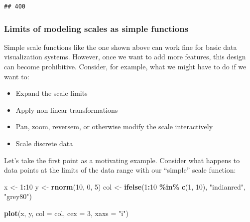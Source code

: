 \documentclass[
]{book}
\newenvironment{Shaded}{\begin{snugshade}}{\end{snugshade}}
\newcommand{\AttributeTok}[1]{\textcolor[rgb]{0.13,0.29,0.53}{#1}}
\newcommand{\DecValTok}[1]{\textcolor[rgb]{0.00,0.00,0.81}{#1}}
\newcommand{\FunctionTok}[1]{\textcolor[rgb]{0.13,0.29,0.53}{\textbf{#1}}}
\newcommand{\NormalTok}[1]{#1}
\newcommand{\OtherTok}[1]{\textcolor[rgb]{0.56,0.35,0.01}{#1}}
\newcommand{\SpecialCharTok}[1]{\textcolor[rgb]{0.81,0.36,0.00}{\textbf{#1}}}
\newcommand{\StringTok}[1]{\textcolor[rgb]{0.31,0.60,0.02}{#1}}
\providecommand{\tightlist}{%
  \setlength{\itemsep}{0pt}\setlength{\parskip}{0pt}}
\theoremstyle{definition}
\theoremstyle{definition}
\theoremstyle{definition}
\theoremstyle{definition}
\theoremstyle{remark}
\begin{document}
\begin{verbatim}
## 400
\end{verbatim}

\subsubsection{Limits of modeling scales as simple functions}\label{limits-of-modeling-scales-as-simple-functions}

Simple scale functions like the one shown above can work fine for basic data visualization systems. However, once we want to add more features, this design can become prohibitive. Consider, for example, what we might have to do if we want to:

\begin{itemize}
\tightlist
\item
  Expand the scale limits
\item
  Apply non-linear transformations
\item
  Pan, zoom, reversem, or otherwise modify the scale interactively
\item
  Scale discrete data
\end{itemize}

Let's take the first point as a motivating example. Consider what happens to data points at the limits of the data range with our ``simple'' scale function:

\begin{Shaded}
\begin{Highlighting}[]
\NormalTok{x }\OtherTok{\textless{}{-}} \DecValTok{1}\SpecialCharTok{:}\DecValTok{10}
\NormalTok{y }\OtherTok{\textless{}{-}} \FunctionTok{rnorm}\NormalTok{(}\DecValTok{10}\NormalTok{, }\DecValTok{0}\NormalTok{, }\DecValTok{5}\NormalTok{)}
\NormalTok{col }\OtherTok{\textless{}{-}} \FunctionTok{ifelse}\NormalTok{(}\DecValTok{1}\SpecialCharTok{:}\DecValTok{10} \SpecialCharTok{\%in\%} \FunctionTok{c}\NormalTok{(}\DecValTok{1}\NormalTok{, }\DecValTok{10}\NormalTok{), }\StringTok{"indianred"}\NormalTok{, }\StringTok{"grey80"}\NormalTok{)}

\FunctionTok{plot}\NormalTok{(x, y, }\AttributeTok{col =}\NormalTok{ col, }\AttributeTok{cex =} \DecValTok{3}\NormalTok{, }\AttributeTok{xaxs =} \StringTok{"i"}\NormalTok{)}
\end{Highlighting}
\end{Shaded}
\end{document}
